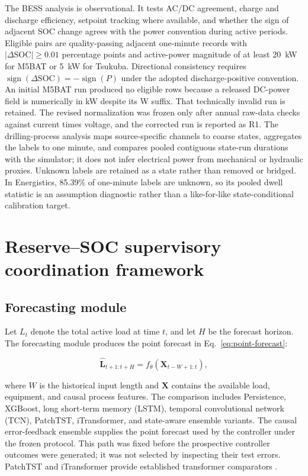 The BESS analysis is observational. It tests AC/DC agreement, charge and
discharge efficiency, setpoint tracking where available, and whether the sign
of adjacent SOC change agrees with the power convention during active periods.
Eligible pairs are quality-passing adjacent one-minute records with
$|\Delta\mathrm{SOC}|\geq0.01$ percentage points and active-power magnitude of
at least 20~kW for M5BAT or 5~kW for Tsukuba. Directional consistency requires
$\operatorname{sign}(\Delta\mathrm{SOC})=-\operatorname{sign}(P)$ under the
adopted discharge-positive convention.
An initial M5BAT run produced no eligible rows because a released DC-power
field is numerically in kW despite its W suffix. That technically invalid run
is retained. The revised normalization was frozen only after annual raw-data
checks against current times voltage, and the corrected run is reported as R1.
The drilling-process analysis maps source-specific channels to coarse states,
aggregates the labels to one minute, and compares pooled contiguous state-run
durations with the simulator; it does not infer electrical power from
mechanical or hydraulic proxies. Unknown labels are retained as a state rather
than removed or bridged. In Energistics, 85.39\% of one-minute labels are
unknown, so its pooled dwell statistic is an assumption diagnostic rather than
a like-for-like state-conditional calibration target.

\section{Reserve--SOC supervisory coordination
framework}\label{reserve-soc-supervisory-coordination-framework}

\subsection{Forecasting module}\label{forecasting-module}

Let $L_t$ denote the total active load at time $t$, and let $H$ be the
forecast horizon. The forecasting module produces the point forecast in
Eq.~\eqref{eq:point-forecast}:

\begin{equation}
\label{eq:point-forecast}
\hat{\mathbf L}_{t+1:t+H}=f_\theta(\mathbf X_{t-W+1:t}),
\end{equation}

where $W$ is the historical input length and $\mathbf X$ contains the
available load, equipment, and causal process features. The comparison
includes Persistence, XGBoost, long short-term memory (LSTM), temporal
convolutional network (TCN), PatchTST, iTransformer, and state-aware ensemble
variants. The causal error-feedback ensemble supplies the point forecast used
by the controller under the frozen protocol. This path was fixed before the
prospective controller outcomes were generated; it was not selected by
inspecting their test errors. PatchTST and iTransformer provide established
transformer comparators \citep{nie2023patchtst,liu2024itransformer}.

